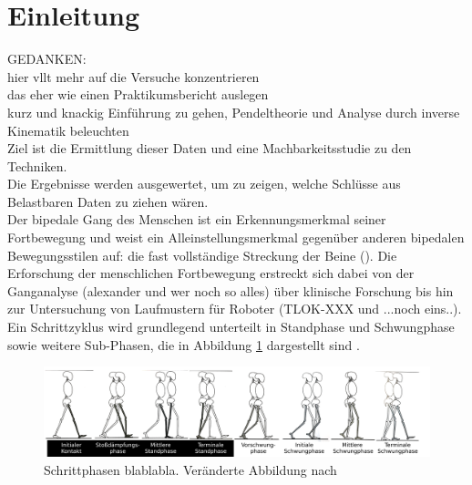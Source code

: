 \section{Einleitung}
GEDANKEN:\\
hier vllt mehr auf die Versuche konzentrieren\\
das eher wie einen Praktikumsbericht auslegen\\
kurz und knackig Einführung zu gehen, Pendeltheorie und Analyse durch inverse Kinematik beleuchten\\
Ziel ist die Ermittlung dieser Daten und eine Machbarkeitsstudie zu den Techniken.\\
Die Ergebnisse werden ausgewertet, um zu zeigen, welche Schlüsse aus Belastbaren Daten zu ziehen wären.\\
Der bipedale Gang des Menschen ist ein Erkennungsmerkmal seiner Fortbewegung und weist ein Alleinstellungsmerkmal gegenüber anderen bipedalen Bewegungsstilen auf: die fast vollständige Streckung der Beine (\cite{alexander1992simple}). Die Erforschung der menschlichen Fortbewegung erstreckt sich dabei von der Ganganalyse (alexander und wer noch so alles) über klinische Forschung \autocite{wren2011efficacy} bis hin zur Untersuchung von Laufmustern für Roboter (TLOK-XXX und ...noch eins..).
Ein Schrittzyklus wird grundlegend unterteilt in Standphase und Schwungphase sowie weitere Sub-Phasen, die in Abbildung \ref{fig:Skizze_Phasen} dargestellt sind \autocite{perry1992gait}.
\begin{figure}[h!]
	\centering
	\includegraphics[width=\linewidth]{bilder/Einleitung/Skizze_Gangphasen_small}
	\caption[Gangphasen]{Schrittphasen blablabla. Veränderte Abbildung nach \autocite{perry1992gait}}
	\label{fig:Skizze_Phasen}
\end{figure}

